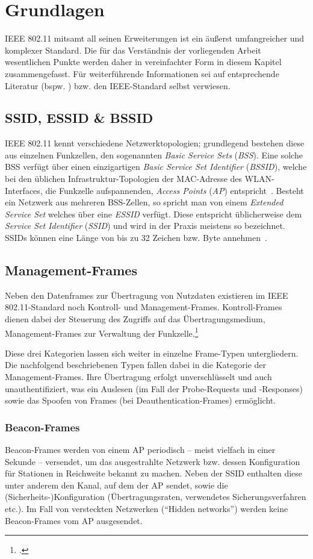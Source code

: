 \section{Grundlagen}\label{sec:grundlagen}
IEEE 802.11 mitsamt all seinen Erweiterungen ist ein äußerst umfangreicher und komplexer Standard. 
Die für das Verständnis der vorliegenden Arbeit wesentlichen Punkte werden daher in vereinfachter Form in diesem Kapitel zusammengefasst. 
Für weiterführende Informationen sei auf entsprechende Literatur (bspw. \cite{rechWLAN}) bzw. den IEEE-Standard selbst verwiesen.

\subsection{SSID, ESSID \& BSSID}
IEEE 802.11 kennt verschiedene Netzwerktopologien; grundlegend bestehen diese aus einzelnen Funkzellen, den sogenannten \textit{Basic Service Sets} (\textit{BSS}). 
Eine solche BSS verfügt über einen einzigartigen \textit{Basic Service Set Identifier} (\textit{BSSID}), welche bei den üblichen Infrastruktur-Topologien der MAC-Adresse des WLAN-Interfaces, die Funkzelle aufspannenden, \textit{Access Points} (\textit{AP}) entspricht~\cite[S. 51]{rechWLAN}. 
Besteht ein Netzwerk aus mehreren BSS-Zellen, so spricht man von einem \textit{Extended Service Set} welches über eine \textit{ESSID} verfügt. 
Diese entspricht üblicherweise dem \textit{Service Set Identifier} (\textit{SSID}) und wird in der Praxis meistens so bezeichnet. 
SSIDs können eine Länge von bis zu 32 Zeichen bzw. Byte annehmen~\cite{netgearESSID}.

\subsection{Management-Frames}
Neben den Datenframes zur Übertragung von Nutzdaten existieren im IEEE 802.11-Standard noch Kontroll- und Management-Frames. 
Kontroll-Frames dienen dabei der Steuerung des Zugriffs auf das Übertragungsmedium, Management-Frames zur Verwaltung der Funkzelle.\footcite[S. 180]{rechWLAN}

Diese drei Kategorien lassen sich weiter in einzelne Frame-Typen untergliedern. 
Die nachfolgend beschriebenen Typen fallen dabei in die Kategorie der Management-Frames. 
Ihre Übertragung erfolgt unverschlüsselt und auch unauthentifiziert, was ein Auslesen (im Fall der Probe-Requests und -Responses) sowie das Spoofen von Frames (bei Deauthentication-Frames) ermöglicht.

\subsubsection{Beacon-Frames}
Beacon-Frames werden von einem AP periodisch -- meist vielfach in einer Sekunde -- versendet, um das ausgestrahlte Netzwerk bzw. dessen Konfiguration für Stationen in Reichweite bekannt zu machen. 
Neben der SSID enthalten diese unter anderem den Kanal, auf dem der AP sendet, sowie die (Sicherheits-)Konfiguration (Übertragungsraten, verwendetes Sicherungsverfahren etc.). 
Im Fall von versteckten Netzwerken (\enquote{Hidden networks}) werden keine Beacon-Frames vom AP ausgesendet.

